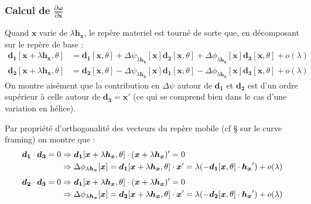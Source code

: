 \subsubsection{Calcul de $\frac{\partial \boldsymbol{\omega}}{\partial \boldsymbol{x}}$}

Quand $\boldsymbol{x}$ varie de $\lambda\boldsymbol{h_x}$, le repère materiel est tourné de sorte que, en décomposant sur le repère de base :
\begin{align}
	\boldsymbol{d_1}[\boldsymbol{x}+\lambda\boldsymbol{h_x}, \theta] & = \boldsymbol{d_1}[\boldsymbol{x}, \theta] + \Delta\psi_{\lambda\boldsymbol{h_x}}[\boldsymbol{x}]\boldsymbol{d_2}[\boldsymbol{x}, \theta] + \Delta\phi_{\lambda\boldsymbol{h_x}}[\boldsymbol{x}]\boldsymbol{d_3}[\boldsymbol{x}, \theta] + o(\lambda)\\
	\boldsymbol{d_2}[\boldsymbol{x}+\lambda\boldsymbol{h_x}, \theta] & = \boldsymbol{d_2}[\boldsymbol{x}, \theta] - \Delta\psi_{\lambda\boldsymbol{h_x}}[\boldsymbol{x}]\boldsymbol{d_1}[\boldsymbol{x}, \theta] - \Delta\phi_{\lambda\boldsymbol{h_x}}[\boldsymbol{x}]\boldsymbol{d_3}[\boldsymbol{x}, \theta] + o(\lambda)
\end{align}
On montre aisément que la contribution en $\Delta\psi$ autour de $\boldsymbol{d_1}$ et $\boldsymbol{d_2}$ est d'un ordre supérieur à celle autour de $\boldsymbol{d_3} = \boldsymbol{x}'$ (ce qui se comprend bien dans le cas d'une variation en hélice).

Par propriété d'orthogonalité des vecteurs du repère mobile (cf § sur le curve framing) on montre que :
\begin{align}
	\boldsymbol{d_1}\cdot\boldsymbol{d_3} = 0 &\Rightarrow \boldsymbol{d_1}[\boldsymbol{x}+\lambda\boldsymbol{h_x}, \theta] \cdot (\boldsymbol{x}+\lambda\boldsymbol{h_x})' = 0\\
	&\Rightarrow \Delta\phi_{\lambda\boldsymbol{h_x}}[\boldsymbol{x}] = \boldsymbol{d_1}[\boldsymbol{x}+\lambda\boldsymbol{h_x}, \theta] \cdot \boldsymbol{x}' = \lambda(-\boldsymbol{d_1}[\boldsymbol{x}, \theta] \cdot \boldsymbol{h_x}') + o(\lambda) \notag
\end{align}
\begin{align}
	\boldsymbol{d_2}\cdot\boldsymbol{d_3} = 0 &\Rightarrow \boldsymbol{d_1}[\boldsymbol{x}+\lambda\boldsymbol{h_x}, \theta] \cdot (\boldsymbol{x}+\lambda\boldsymbol{h_x})' = 0\\
	&\Rightarrow \Delta\phi_{\lambda\boldsymbol{h_x}}[\boldsymbol{x}] = \boldsymbol{d_2}[\boldsymbol{x}+\lambda\boldsymbol{h_x}, \theta] \cdot \boldsymbol{x}' = \lambda(-\boldsymbol{d_2}[\boldsymbol{x}, \theta] \cdot \boldsymbol{h_x}') + o(\lambda) \notag
\end{align}

